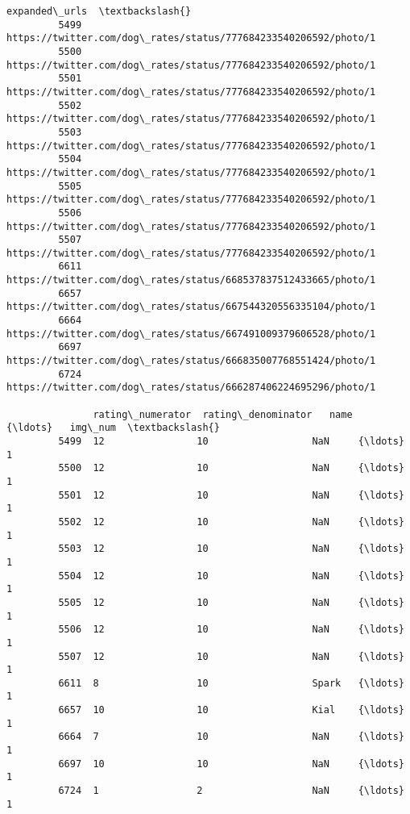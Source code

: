 \documentclass[11pt]{article}
\begin{document}
\begin{Verbatim}[commandchars=\\\{\}]
                                                                 expanded\_urls  \textbackslash{}
         5499  https://twitter.com/dog\_rates/status/777684233540206592/photo/1   
         5500  https://twitter.com/dog\_rates/status/777684233540206592/photo/1   
         5501  https://twitter.com/dog\_rates/status/777684233540206592/photo/1   
         5502  https://twitter.com/dog\_rates/status/777684233540206592/photo/1   
         5503  https://twitter.com/dog\_rates/status/777684233540206592/photo/1   
         5504  https://twitter.com/dog\_rates/status/777684233540206592/photo/1   
         5505  https://twitter.com/dog\_rates/status/777684233540206592/photo/1   
         5506  https://twitter.com/dog\_rates/status/777684233540206592/photo/1   
         5507  https://twitter.com/dog\_rates/status/777684233540206592/photo/1   
         6611  https://twitter.com/dog\_rates/status/668537837512433665/photo/1   
         6657  https://twitter.com/dog\_rates/status/667544320556335104/photo/1   
         6664  https://twitter.com/dog\_rates/status/667491009379606528/photo/1   
         6697  https://twitter.com/dog\_rates/status/666835007768551424/photo/1   
         6724  https://twitter.com/dog\_rates/status/666287406224695296/photo/1   
         
               rating\_numerator  rating\_denominator   name   {\ldots}   img\_num  \textbackslash{}
         5499  12                10                  NaN     {\ldots}    1        
         5500  12                10                  NaN     {\ldots}    1        
         5501  12                10                  NaN     {\ldots}    1        
         5502  12                10                  NaN     {\ldots}    1        
         5503  12                10                  NaN     {\ldots}    1        
         5504  12                10                  NaN     {\ldots}    1        
         5505  12                10                  NaN     {\ldots}    1        
         5506  12                10                  NaN     {\ldots}    1        
         5507  12                10                  NaN     {\ldots}    1        
         6611  8                 10                  Spark   {\ldots}    1        
         6657  10                10                  Kial    {\ldots}    1        
         6664  7                 10                  NaN     {\ldots}    1        
         6697  10                10                  NaN     {\ldots}    1        
         6724  1                 2                   NaN     {\ldots}    1        
         

\end{Verbatim}
\end{document}
